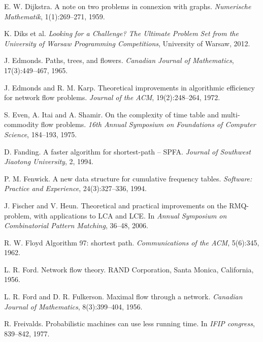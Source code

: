 \begin{thebibliography}{9}
  E. W. Dijkstra.
  A note on two problems in connexion with graphs.
  \emph{Numerische Mathematik}, 1(1):269--271, 1959.

  K. Diks et al.
  \emph{Looking for a Challenge? The Ultimate Problem Set from
  the University of Warsaw Programming Competitions}, University of Warsaw, 2012.



  J. Edmonds.
  Paths, trees, and flowers.
  \emph{Canadian Journal of Mathematics}, 17(3):449--467, 1965.

  J. Edmonds and R. M. Karp.
  Theoretical improvements in algorithmic efficiency for network flow problems.
  \emph{Journal of the ACM}, 19(2):248--264, 1972.

  S. Even, A. Itai and A. Shamir.
  On the complexity of time table and multi-commodity flow problems.
  \emph{16th Annual Symposium on Foundations of Computer Science}, 184--193, 1975.

  D. Fanding.
  A faster algorithm for shortest-path -- SPFA.
  \emph{Journal of Southwest Jiaotong University}, 2, 1994.

  P. M. Fenwick.
  A new data structure for cumulative frequency tables.
  \emph{Software: Practice and Experience}, 24(3):327--336, 1994.

  J. Fischer and V. Heun.
  Theoretical and practical improvements on the RMQ-problem, with applications to LCA and LCE.
  In \emph{Annual Symposium on Combinatorial Pattern Matching}, 36--48, 2006.

  R. W. Floyd
  Algorithm 97: shortest path.
  \emph{Communications of the ACM}, 5(6):345, 1962.

  L. R. Ford.
  Network flow theory.
  RAND Corporation, Santa Monica, California, 1956.

  L. R. Ford and D. R. Fulkerson.
  Maximal flow through a network.
  \emph{Canadian Journal of Mathematics}, 8(3):399--404, 1956.

  R. Freivalds.
  Probabilistic machines can use less running time.
  In \emph{IFIP congress}, 839--842, 1977.


\end{thebibliography}
